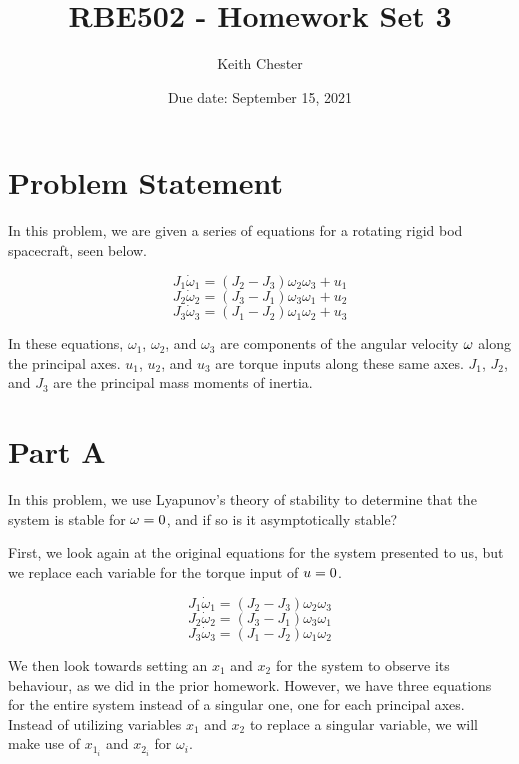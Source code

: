 \documentclass{article}
\title{RBE502 - Homework Set 3}
\author{Keith Chester}
\date{Due date: September 15, 2021}
\begin{document}
\maketitle

\section*{Problem Statement}
In this problem, we are given a series of equations for a rotating rigid bod spacecraft, seen below.

\[J_1 \dot{\omega}_1 = (J_2 - J_3)\omega_2 \omega_3 + u_1\]
\[J_2 \dot{\omega}_2 = (J_3 - J_1)\omega_3 \omega_1 + u_2\]
\[J_3 \dot{\omega}_3 = (J_1 - J_2)\omega_1 \omega_2 + u_3\]

In these equations, $\omega_1$, $\omega_2$, and $\omega_3$ are components of the angular velocity ${\boldmath{\omega}}$ along the principal axes. $u_1$, $u_2$, and $u_3$ are torque inputs along these same axes. $J_1$, $J_2$, and $J_3$ are the principal mass moments of inertia.

\section*{Part A}

In this problem, we use Lyapunov's theory of stability to determine that the system is stable for $\boldmath{\omega}=0$, and if so is it asymptotically stable?

First, we look again at the original equations for the system presented to us, but we replace each variable for the torque input of $\boldmath{u} = 0$.

\[J_1 \dot{\omega}_1 = (J_2 - J_3)\omega_2 \omega_3 \]
\[J_2 \dot{\omega}_2 = (J_3 - J_1)\omega_3 \omega_1 \]
\[J_3 \dot{\omega}_3 = (J_1 - J_2)\omega_1 \omega_2 \]

We then look towards setting an $x_1$ and $x_2$ for the system to observe its behaviour, as we did in the prior homework. However, we have three equations for the entire system instead of a singular one, one for each principal axes. Instead of utilizing variables $x_1$ and $x_2$ to replace a singular variable, we will make use of $x_{1_i}$ and $x_{2_i}$ for $\omega_i$.
\end{document}
